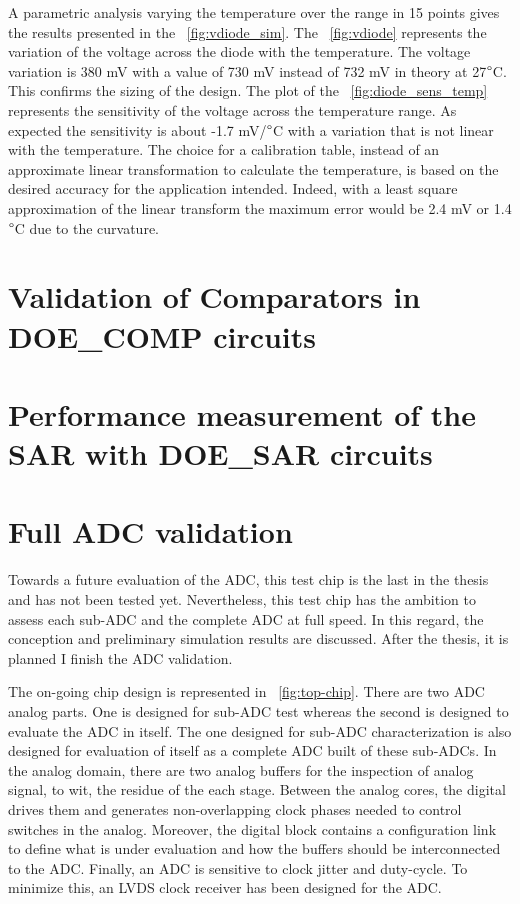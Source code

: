 A parametric analysis varying the temperature over the range in 15 points gives the results presented in the \figurename~\ref{fig:vdiode_sim}. The \figurename~\ref{fig:vdiode} represents the variation of the voltage across the diode with the temperature. The voltage variation is 380 mV with a value of 730 mV instead of 732 mV in theory at 27\(\degree\)C. This confirms the sizing of the design. The plot of the \figurename~\ref{fig:diode_sens_temp} represents the sensitivity of the voltage across the temperature range. As expected the sensitivity is about -1.7 mV/\(\degree\)C with a variation that is not linear with the temperature. The choice for a calibration table, instead of an approximate linear transformation to calculate the temperature, is based on the desired accuracy for the application intended. Indeed, with a least square approximation of the linear transform the maximum error would be 2.4 mV or 1.4\(\degree\)C due to the curvature.

\clearpage
\section{Validation of Comparators in DOE\_COMP circuits}


\clearpage
\section{Performance measurement of the SAR with DOE\_SAR circuits}


\section{Full ADC validation}
Towards a future evaluation of the ADC, this test chip is the last in the thesis and has not been tested yet. Nevertheless, this test chip has the ambition to assess each sub-ADC and the complete ADC at full speed. In this regard, the conception and preliminary simulation results are discussed. After the thesis, it is planned I finish the ADC validation.

The on-going chip design is represented in \figurename~\ref{fig:top-chip}. There are two ADC analog parts. One is designed for sub-ADC test whereas the second is designed to evaluate the ADC in itself. The one designed for sub-ADC characterization is also designed for evaluation of itself as a complete ADC built of these sub-ADCs. In the analog domain, there are two analog buffers for the inspection of analog signal, to wit, the residue of the each stage. Between the analog cores, the digital drives them and generates non-overlapping clock phases needed to control switches in the analog. Moreover, the digital block contains a configuration link to define what is under evaluation and how the buffers should be interconnected to the ADC\@. Finally, an ADC is sensitive to clock jitter and duty-cycle. To minimize this, an LVDS clock receiver has been designed for the ADC\@.

